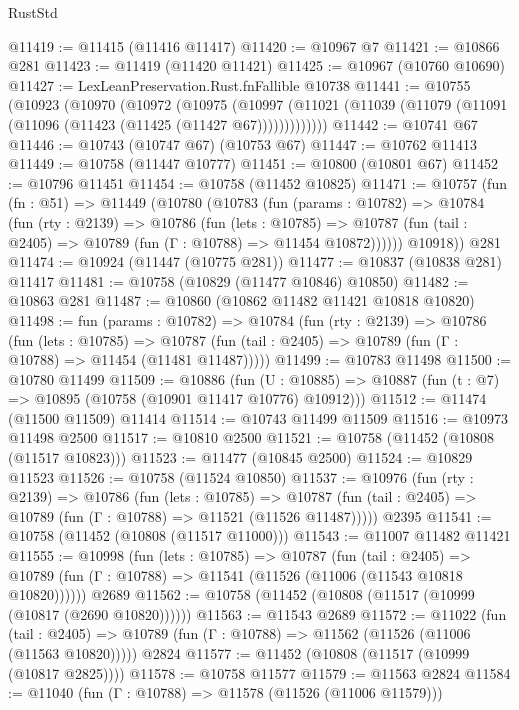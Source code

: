 \begin{lexlean}{RustStd}
\begin{coremodule}
@11419 := @11415 (@11416 @11417)
@11420 := @10967 @7
@11421 := @10866 @281
@11423 := @11419 (@11420 @11421)
@11425 := @10967 (@10760 @10690)
@11427 := LexLeanPreservation.Rust.fnFallible @10738
@11441 := @10755
    (@10923
      (@10970
        (@10972
          (@10975
            (@10997 (@11021 (@11039 (@11079 (@11091 (@11096 (@11423 (@11425 (@11427 @67)))))))))))))
@11442 := @10741 @67
@11446 := @10743 (@10747 @67) (@10753 @67)
@11447 := @10762 @11413
@11449 := @10758 (@11447 @10777)
@11451 := @10800 (@10801 @67)
@11452 := @10796 @11451
@11454 := @10758 (@11452 @10825)
@11471 := @10757
    (fun (fn : @51) =>
    @11449
      (@10780
        (@10783
          (fun (params : @10782) =>
          @10784
            (fun (rty : @2139) =>
            @10786
              (fun (lets : @10785) =>
              @10787 (fun (tail : @2405) => @10789 (fun (Γ : @10788) => @11454 @10872))))))
        @10918))
    @281
@11474 := @10924 (@11447 (@10775 @281))
@11477 := @10837 (@10838 @281) @11417
@11481 := @10758 (@10829 (@11477 @10846) @10850)
@11482 := @10863 @281
@11487 := @10860 (@10862 @11482 @11421 @10818 @10820)
@11498 := fun (params : @10782) =>
  @10784
    (fun (rty : @2139) =>
    @10786
      (fun (lets : @10785) =>
      @10787 (fun (tail : @2405) => @10789 (fun (Γ : @10788) => @11454 (@11481 @11487)))))
@11499 := @10783 @11498
@11500 := @10780 @11499
@11509 := @10886
    (fun (U : @10885) => @10887 (fun (t : @7) => @10895 (@10758 (@10901 @11417 @10776) @10912)))
@11512 := @11474 (@11500 @11509) @11414
@11514 := @10743 @11499 @11509
@11516 := @10973 @11498 @2500
@11517 := @10810 @2500
@11521 := @10758 (@11452 (@10808 (@11517 @10823)))
@11523 := @11477 (@10845 @2500)
@11524 := @10829 @11523
@11526 := @10758 (@11524 @10850)
@11537 := @10976
    (fun (rty : @2139) =>
    @10786
      (fun (lets : @10785) =>
      @10787 (fun (tail : @2405) => @10789 (fun (Γ : @10788) => @11521 (@11526 @11487)))))
    @2395
@11541 := @10758 (@11452 (@10808 (@11517 @11000)))
@11543 := @11007 @11482 @11421
@11555 := @10998
    (fun (lets : @10785) =>
    @10787
      (fun (tail : @2405) =>
      @10789 (fun (Γ : @10788) => @11541 (@11526 (@11006 (@11543 @10818 @10820))))))
    @2689
@11562 := @10758 (@11452 (@10808 (@11517 (@10999 (@10817 (@2690 @10820))))))
@11563 := @11543 @2689
@11572 := @11022
    (fun (tail : @2405) => @10789 (fun (Γ : @10788) => @11562 (@11526 (@11006 (@11563 @10820)))))
    @2824
@11577 := @11452 (@10808 (@11517 (@10999 (@10817 @2825))))
@11578 := @10758 @11577
@11579 := @11563 @2824
@11584 := @11040 (fun (Γ : @10788) => @11578 (@11526 (@11006 @11579)))

\end{coremodule}
\end{lexlean}
